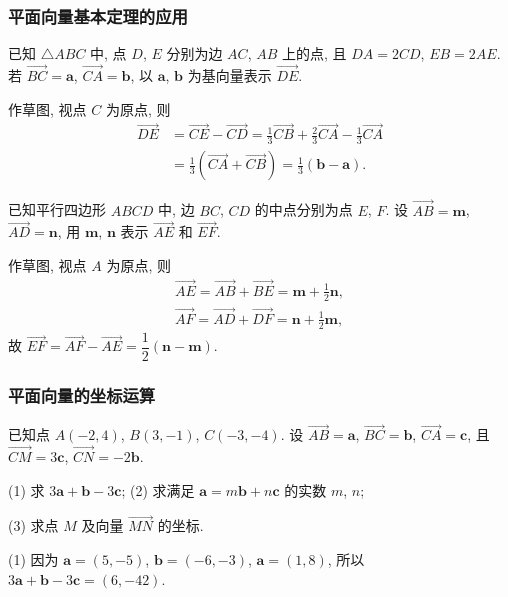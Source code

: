 \subsubsection{平面向量基本定理的应用}
\begin{example}
    已知 $\triangle ABC$ 中, 点 $D$, $E$ 分别为边 $AC$, $AB$ 上的点,
    且 $DA=2CD$, $EB=2AE$. 若 $\overrightarrow{BC}=\bm{a}$, 
    $\overrightarrow{CA}=\bm{b}$, 以 $\bm{a}$, $\bm{b}$ 为基向量表示 
    $\overrightarrow{DE}$.
\end{example}
\beginsolution
    作草图, 视点 $C$ 为原点, 则
    \[\begin{aligned}
        \overrightarrow{DE}
        &= \overrightarrow{CE}- \overrightarrow{CD}
         = \frac13\overrightarrow{CB}+ \frac23\overrightarrow{CA}
            - \frac13\overrightarrow{CA}\\
        &= \frac13(\overrightarrow{CA}+ \overrightarrow{CB})
         = \frac13(\bm{b}- \bm{a}).
    \end{aligned}\]
\endsolution

\lianxi
\begin{exercise}[s]
    已知平行四边形 $ABCD$ 中, 边 $BC$, $CD$ 的中点分别为点 $E$, $F$.
    设 $\overrightarrow{AB}=\bm{m}$, $\overrightarrow{AD}=\bm{n}$,
    用 $\bm{m}$, $\bm{n}$ 表示 $\overrightarrow{AE}$ 和 $\overrightarrow{EF}$.
\end{exercise}
\beginsolution
    作草图, 视点 $A$ 为原点, 则
    \[\begin{gathered}
        \overrightarrow{AE}
        = \overrightarrow{AB}+ \overrightarrow{BE}
        = \bm{m}+ \frac12\bm{n},\\
        \overrightarrow{AF}
        = \overrightarrow{AD}+ \overrightarrow{DF}
        = \bm{n}+ \frac12\bm{m},
    \end{gathered}\]
    故 $\overrightarrow{EF}= \overrightarrow{AF}- \overrightarrow{AE}= \dfrac12(\bm{n}- \bm{m})$.
\endsolution

\subsubsection{平面向量的坐标运算}
\begin{example}
    已知点 $A(-2,4)$, $B(3,-1)$, $C(-3,-4)$. 设 $\overrightarrow{AB}=\bm{a}$, $\overrightarrow{BC}=\bm{b}$, $\overrightarrow{CA}=\bm{c}$, 且 $\overrightarrow{CM}=3\bm{c}$, $\overrightarrow{CN}=-2\bm{b}$.
    
    (1) 求 $3\bm{a}+\bm{b}-3\bm{c}$;\qquad
    (2) 求满足 $\bm{a}=m\bm{b}+n\bm{c}$ 的实数 $m$, $n$;
    
    (3) 求点 $M$ 及向量 $\overrightarrow{MN}$ 的坐标.
\end{example}
\beginsolution
    (1) 因为 $\bm{a}= (5,-5)$, $\bm{b}= (-6,-3)$, $\bm{a}= (1,8)$, 所以 $3\bm{a}+\bm{b}-3\bm{c}= (6,-42)$.

